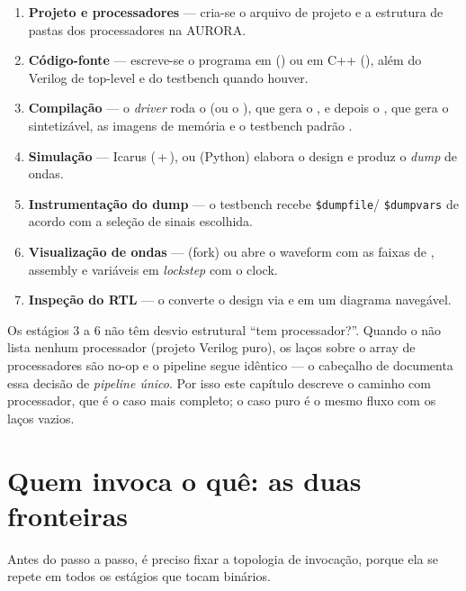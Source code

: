 \begin{enumerate}[leftmargin=2.2em]
  \item \textbf{Projeto e processadores} — cria-se o arquivo de projeto 
        e a estrutura de pastas dos processadores na AURORA.
  \item \textbf{Código-fonte} — escreve-se o programa em \cmm{} () ou
        em C++ (), além do Verilog de top-level e do testbench quando
        houver.
  \item \textbf{Compilação} — o \emph{driver}  roda o 
        (ou o ), que gera o , e depois o ,
        que gera o  sintetizável, as imagens de memória e o testbench
        padrão .
  \item \textbf{Simulação} — Icarus (\,+\,), 
        ou  (Python) elabora o design e produz o \emph{dump} de ondas.
  \item \textbf{Instrumentação do dump} — o testbench recebe \lstinline|$dumpfile|/%
        \lstinline|$dumpvars| de acordo com a seleção de sinais escolhida.
  \item \textbf{Visualização de ondas} —  (fork) ou 
        abre o waveform com as faixas de \cmm{}, assembly e variáveis em
        \emph{lockstep} com o clock.
  \item \textbf{Inspeção do RTL} — o  converte o design via 
        e  em um diagrama navegável.
\end{enumerate}

\begin{nota}
Os estágios 3 a 6 não têm desvio estrutural ``tem processador?''. Quando o
 não lista nenhum processador (projeto Verilog puro), os laços sobre o
array de processadores são no-op e o pipeline segue idêntico — o cabeçalho de
 documenta essa decisão de \emph{pipeline único}. Por
isso este capítulo descreve o caminho com processador, que é o caso mais completo;
o caso puro é o mesmo fluxo com os laços vazios.
\end{nota}

\section{Quem invoca o quê: as duas fronteiras}
\label{sec:17-fronteiras}

Antes do passo a passo, é preciso fixar a topologia de invocação, porque ela se
repete em todos os estágios que tocam binários.

